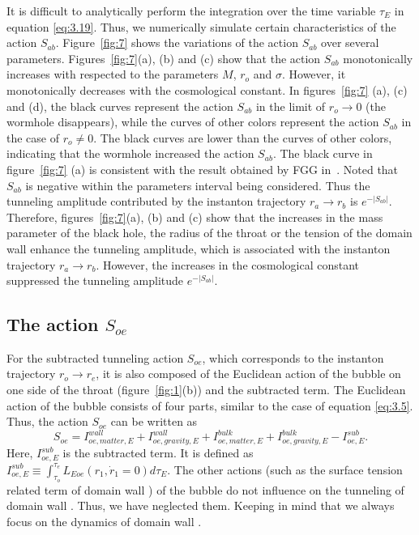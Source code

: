 \documentclass[12pt]{article}
\begin{document}
It is difficult to analytically perform the integration over the time variable $\tau_{E}$ in equation \eqref{eq:3.19}. Thus, we numerically simulate certain characteristics of the action $S_{ab}$.  Figure~\ref{fig:7} shows the variations of the action $S_{ab}$ over several parameters. Figures~\ref{fig:7}(a), (b) and (c) show that the action $S_{ab}$  monotonically increases with respected to the parameters $M$, $r_{o}$ and $\sigma$. However, it monotonically decreases with the cosmological constant. In figures~\ref{fig:7} (a), (c) and (d), the black curves represent the action $S_{ab}$ in the limit of $r_{o}\rightarrow 0$ (the wormhole disappears), while the curves of other colors represent the action $S_{ab}$ in the case of $r_{o}\neq 0$. The black curves are lower than the curves of other colors, indicating that the wormhole increased the action $S_{ab}$. The black curve in figure~\ref{fig:7} (a) is consistent with the result obtained by FGG in~\cite{EAJ}.
Noted that $S_{ab}$ is negative  within  the parameters interval being considered. Thus the tunneling amplitude contributed by the instanton trajectory $r_{a}\rightarrow r_{b}$ is $e^{-|S_{ab}|}$. Therefore, figures~\ref{fig:7}(a), (b) and (c) show that the increases in the mass parameter of the black hole, the radius of the throat or the tension of the domain wall enhance the tunneling amplitude, which is associated with the instanton trajectory $r_{a}\rightarrow r_{b}$. However, the increases in the cosmological constant suppressed the tunneling amplitude $e^{-|S_{ab}|}$.




\subsection{The action $S_{oe}$}
\label{sec:3.2}

For the subtracted tunneling action $S_{oe}$, which corresponds to the instanton trajectory $r_{o}\rightarrow r_{e}$, it is also composed of the Euclidean action of the bubble on one side of the throat (figure~\ref{fig:1}(b)) and the subtracted term. The Euclidean action of the bubble consists of four parts, similar to the case of equation \eqref{eq:3.5}. Thus, the action $S_{oe}$ can be written as
\begin{equation}
\label{eq:3.20}%
S_{oe}=I^{wall}_{oe,matter,E}+I^{wall}_{oe,gravity,E}+I^{bulk}_{oe,matter,E}+I^{bulk}_{oe,gravity,E}-I^{sub}_{oe,E}.
\end{equation}
Here, $I^{sub}_{oe,E}$ is the subtracted term. It is defined as $I^{sub}_{oe,E}\equiv\int_{\tau_{o}}^{\tau_{e}}L_{Eoe}(r_{1},\dot{r}_{1}=0)d\tau_{E}$. The other actions (such as the surface tension related term of domain wall \uppercase\expandafter{}) of the bubble do not influence on the tunneling of domain wall \uppercase\expandafter{}. Thus, we have neglected them. Keeping in mind that we always focus on the dynamics of domain wall \uppercase\expandafter{}.
\end{document}

